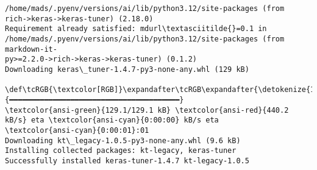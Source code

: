 \documentclass[12pt letter]{report}
\begin{document}
\begin{Verbatim}[commandchars=\\\{\}]
/home/mads/.pyenv/versions/ai/lib/python3.12/site-packages (from
rich->keras->keras-tuner) (2.18.0)
Requirement already satisfied: mdurl\textasciitilde{}=0.1 in
/home/mads/.pyenv/versions/ai/lib/python3.12/site-packages (from markdown-it-
py>=2.2.0->rich->keras->keras-tuner) (0.1.2)
Downloading keras\_tuner-1.4.7-py3-none-any.whl (129 kB)
   \def\tcRGB{\textcolor[RGB]}\expandafter\tcRGB\expandafter{\detokenize{114,156,31}}{━━━━━━━━━━━━━━━━━━━━━━━━━━━━━━━━━━━━━━━}
\textcolor{ansi-green}{129.1/129.1 kB} \textcolor{ansi-red}{440.2 kB/s} eta \textcolor{ansi-cyan}{0:00:00} kB/s eta
\textcolor{ansi-cyan}{0:00:01}:01
Downloading kt\_legacy-1.0.5-py3-none-any.whl (9.6 kB)
Installing collected packages: kt-legacy, keras-tuner
Successfully installed keras-tuner-1.4.7 kt-legacy-1.0.5
    \end{Verbatim}
\end{document}
